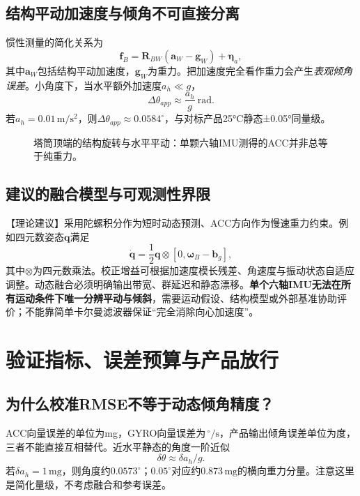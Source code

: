 \documentclass[UTF8,a4paper,11pt,oneside,openany,fontset=none]{ctexbook}
\newcommand{\vct}[1]{\bm{#1}}
\newcommand{\mat}[1]{\mathbf{#1}}
\newcommand{\dps}{\,^{\circ}/\mathrm s}
\begin{document}
\section{结构平动加速度与倾角不可直接分离}
惯性测量的简化关系为
\begin{equation}\vct f_B=\mat R_{BW}(\vct a_W-\vct g_W)+\vct\eta_a,
\end{equation}
其中$\vct a_W$包括结构平动加速度，$\vct g_W$为重力。把加速度完全看作重力会产生\emph{表观倾角误差}。小角度下，当水平额外加速度$ a_h\ll g$，
\begin{equation}\Delta\theta_{app}\approx\frac{a_h}{g}\ \mathrm{rad}.
\end{equation}
若$a_h=0.01\,\mathrm{m/s^2}$，则$\Delta\theta_{app}\approx0.0584^\circ$，与对标产品25°C静态±0.05°同量级。
\begin{figure}[htbp]\centering\caption{塔筒顶端的结构旋转与水平平动：单颗六轴IMU测得的ACC并非总等于纯重力。}\end{figure}

\section{建议的融合模型与可观测性界限}
【理论建议】采用陀螺积分作为短时动态预测、ACC方向作为慢速重力约束。例如四元数姿态$\vct q$满足
\begin{equation}\dot{\vct q}=\frac12\vct q\otimes[0,\vct\omega_B-\vct b_g],
\end{equation}
其中$\otimes$为四元数乘法。校正增益可根据加速度模长残差、角速度与振动状态自适应调整。动态融合必须明确输出带宽、群延迟和静态漂移。\textbf{单个六轴IMU无法在所有运动条件下唯一分辨平动与倾斜}，需要运动假设、结构模型或外部基准协助评价；不能靠简单卡尔曼滤波器保证“完全消除向心加速度”。

\chapter{验证指标、误差预算与产品放行}
\section{为什么校准RMSE不等于动态倾角精度？}
ACC向量误差的单位为mg，GYRO向量误差为$\dps$，产品输出倾角误差单位为度，三者不能直接互相替代。近水平静态的角度一阶近似
\begin{equation}\delta\theta\approx\delta a_h/g.
\end{equation}
若$\delta a_h=1\,\mathrm{mg}$，则角度约$0.0573^\circ$；$0.05^\circ$对应约$0.873\,\mathrm{mg}$的横向重力分量。注意这里是简化量级，不考虑融合和参考误差。
\end{document}
